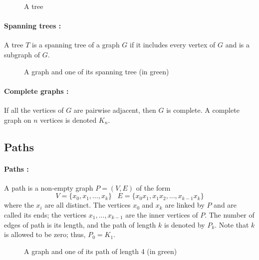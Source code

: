 \begin{figure}[!h]
  \begin{center}
    
  \end{center}
  \caption{A tree}
\end{figure}

\paragraph{Spanning trees :}
A tree $T$ is a spanning tree of a graph $G$ if it includes every vertex of $G$ 
and is a subgraph of $G$.

\begin{figure}[!h]
  \begin{center}
    
  \end{center}
  \caption{A graph and one of its spanning tree (in green)}
\end{figure}

\paragraph{Complete graphs :}
If all the vertices of $G$ are pairwise adjacent, then $G$ is complete. A
complete graph on $n$ vertices is denoted $K_n$.

\subsection{Paths}
\paragraph{Paths :}
A path is a non-empty graph $P = (V, E)$ of the form
$$ V = \{x_0,x_1, \dots, x_k \} \;\;\; E=\{x_0x_1, x_1x_2, \dots, x_{k-1}x_k \}$$
where the $x_i$ are all distinct. The vertices $x_0$ and $x_k$ are linked
by $P$ and are called its ends; the vertices $x_1, \dots, x_{k-1}$ are the
inner vertices of $P$. The number of edges of path is its
length, and the path of length $k$ is denoted by $P_k$. Note that $k$ is
allowed to be zero; thus, $P_0 = K_1$.

\begin{figure}[!h]
  \begin{center}
    
  \end{center}
  \caption{A graph and one of its path of length 4 (in green)}
\end{figure}

